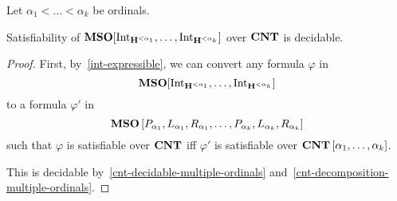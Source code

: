 \begin{theorem}\label{multiple-ordinals-satisfiability}
  Let $\alpha_1 < \ldots < \alpha_k$ be ordinals.

  Satisfiability of $\mathbf{MSO}[\mathrm{Int}_{\mathbf{H}^{< \alpha_1}}, \ldots, \mathrm{Int}_{\mathbf{H}^{< \alpha_k}}]$
  over $\mathbf{CNT}$ is decidable.
\end{theorem}

\begin{proof}
  First, by~\cref{int-expressible}, we can convert
  any formula $\varphi$ in \[
    \mathbf{MSO}[\mathrm{Int}_{\mathbf{H}^{< \alpha_1}}, \ldots, \mathrm{Int}_{\mathbf{H}^{< \alpha_k}}]
  \]
  to a formula $\varphi'$ in \[
    \mathbf{MSO} \left[ {P_{\alpha_1}, L_{\alpha_1}, R_{\alpha_1}, \ldots, P_{\alpha_k}, L_{\alpha_k}, R_{\alpha_k}} \right]
  \]
  such that $\varphi$ is satisfiable over $\mathbf{CNT}$
  iff $\varphi'$ is satisfiable over $\mathbf{CNT} \left[ {\alpha_1, \ldots, \alpha_k} \right]$.

  This is decidable by~\cref{cnt-decidable-multiple-ordinals} and~\cref{cnt-decomposition-multiple-ordinals}.
\end{proof}